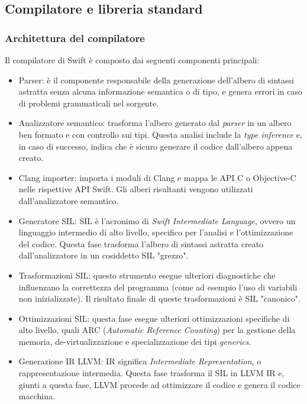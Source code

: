 \subsection{Compilatore e libreria standard}
\subsubsection{Architettura del compilatore}
Il compilatore di Swift è composto dai seguenti componenti principali:
\begin{itemize}
\item Parser: è il componente responsabile della generazione dell'albero di sintassi astratta senza alcuna informazione semantica o di tipo, e genera errori in caso di problemi grammaticali nel sorgente.
\item Analizzatore semantico: trasforma l'albero generato dal \textit{parser} in un albero ben formato e con controllo sui tipi. Questa analisi include la \textit{type inference} e, in caso di successo, indica che è sicuro generare il codice dall'albero appena creato.
\item Clang importer: importa i moduli di Clang e mappa le API C o Objective-C nelle rispettive API Swift. Gli alberi risultanti vengono utilizzati dall'analizzatore semantico.
\item Generatore SIL: SIL è l'acronimo di \textit{Swift Intermediate Language}, ovvero un linguaggio intermedio di alto livello, specifico per l'analisi e l'ottimizzazione del codice. Questa fase trasforma l'albero di sintassi astratta creato dall'analizzatore in un cosiddetto SIL "grezzo".
\item Trasformazioni SIL: questo strumento esegue ulteriori diagnostiche che influenzano la correttezza del programma (come ad esempio l'uso di variabili non inizializzate). Il risultato finale di queste trasformazioni è SIL "canonico".
\item Ottimizzazioni SIL: questa fase esegue ulteriori ottimizzazioni specifiche di alto livello, quali ARC (\textit{Automatic Reference Counting}) per la gestione della memoria, de-virtualizzazione e specializzazione dei tipi \textit{generics}.
\item Generazione IR LLVM: IR significa \textit{Intermediate Representation}, o rappresentazione intermedia. Questa fase trasforma il SIL in LLVM IR e, giunti a questa fase, LLVM procede ad ottimizzare il codice e genera il codice macchina.
\end{itemize}
